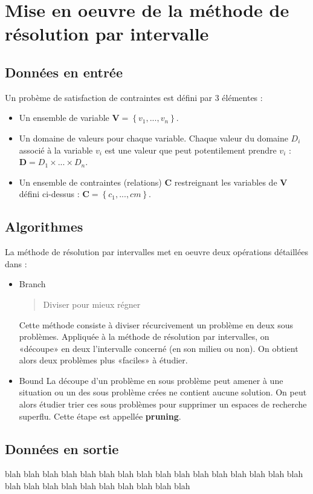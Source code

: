 \section{Mise en oeuvre de la méthode de résolution par intervalle}


\subsection{Données en entrée}
Un probème de satisfaction de contraintes est défini par 3 élémentes : 
\begin{itemize}
\item
Un ensemble de variable $\mathbf{V} = \left\{ v_1,...,v_n \right\}$.
\item
Un domaine de valeurs pour chaque variable. Chaque valeur du domaine $D_i$ associé à la variable $v_i$ est une valeur que peut potentilement prendre $v_i$ : $\mathbf{D} = D_1 \times ... \times D_n $.
\item
Un ensemble de contraintes (relations) $\mathbf{C}$ restreignant les variables de $\mathbf{V}$ défini ci-dessus :  $\mathbf{C} = \left\{c_1,...,cm\right\}$. 
\end{itemize}

\subsection{Algorithmes}
La méthode de résolution par intervalles met en oeuvre deux opérations détaillées dans \cite{Neumaier}: 
\begin{itemize}
\item{Branch}
\begin{quote}Diviser pour mieux régner\end{quote} Cette méthode consiste à diviser récurcivement un problème en deux sous problèmes. Appliquée à la méthode de résolution par intervalles, on «découpe» en deux l'intervalle concerné (en son milieu ou non). On obtient alors deux problèmes plus «faciles» à étudier.
\item{Bound}
La découpe d'un problème en sous problème peut amener à une situation ou un des sous problème crées ne contient aucune solution. On peut alors étudier trier ces sous problèmes pour supprimer un espaces de recherche superflu. Cette étape est appellée \textbf{pruning}.
\end{itemize}


\subsection{Données en sortie}
 blah blah blah blah blah blah blah blah blah blah blah blah blah blah blah blah blah blah blah blah blah blah blah blah blah blah
